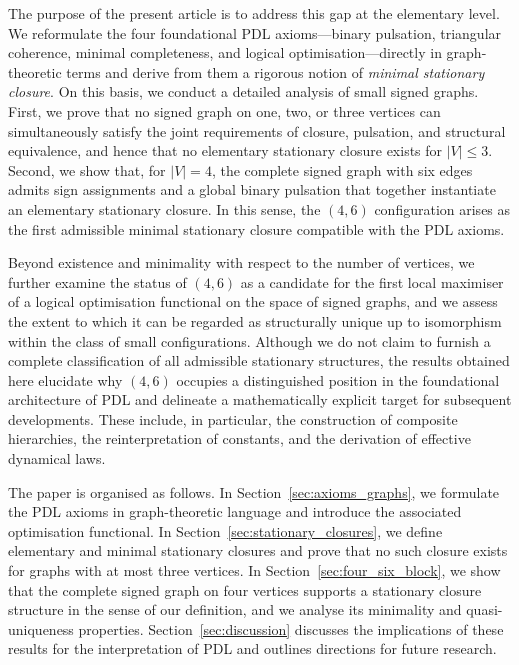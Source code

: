 \documentclass[11pt,a4paper]{article}
\theoremstyle{definition}
\begin{document}
The purpose of the present article is to address this gap at the elementary level. We reformulate the four foundational PDL axioms—binary pulsation, triangular coherence, minimal completeness, and logical optimisation—directly in graph-theoretic terms and derive from them a rigorous notion of \emph{minimal stationary closure}.\cite{PDL_Intro_2026,PDL_Main_2026} On this basis, we conduct a detailed analysis of small signed graphs. First, we prove that no signed graph on one, two, or three vertices can simultaneously satisfy the joint requirements of closure, pulsation, and structural equivalence, and hence that no elementary stationary closure exists for $|V|\leq 3$.\cite{PDL_Main_2026,Harary1953,CartwrightHarary1956} Second, we show that, for $|V|=4$, the complete signed graph with six edges admits sign assignments and a global binary pulsation that together instantiate an elementary stationary closure. In this sense, the $(4,6)$ configuration arises as the first admissible minimal stationary closure compatible with the PDL axioms.\cite{PDL_Main_2026}

Beyond existence and minimality with respect to the number of vertices, we further examine the status of $(4,6)$ as a candidate for the first local maximiser of a logical optimisation functional on the space of signed graphs, and we assess the extent to which it can be regarded as structurally unique up to isomorphism within the class of small configurations.\cite{PDL_Main_2026,PDL_Global_Mapping_2026} Although we do not claim to furnish a complete classification of all admissible stationary structures, the results obtained here elucidate why $(4,6)$ occupies a distinguished position in the foundational architecture of PDL and delineate a mathematically explicit target for subsequent developments. These include, in particular, the construction of composite hierarchies, the reinterpretation of constants, and the derivation of effective dynamical laws.\cite{Combinatorial_Proton_v2_2026,Alpha_PDL_v2_2026,Schrodinger_PDL_v2_2026,Einstein_Dirac_PDL_2026}

The paper is organised as follows. In Section~\ref{sec:axioms_graphs}, we formulate the PDL axioms in graph-theoretic language and introduce the associated optimisation functional. In Section~\ref{sec:stationary_closures}, we define elementary and minimal stationary closures and prove that no such closure exists for graphs with at most three vertices. In Section~\ref{sec:four_six_block}, we show that the complete signed graph on four vertices supports a stationary closure structure in the sense of our definition, and we analyse its minimality and quasi-uniqueness properties. Section~\ref{sec:discussion} discusses the implications of these results for the interpretation of PDL and outlines directions for future research.
\end{document}

